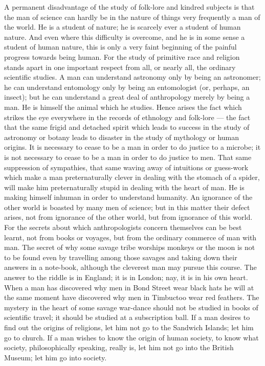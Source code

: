 
A permanent disadvantage of the study of folk-lore and kindred subjects is that the man of science can hardly be in the nature of things very frequently a man of the world. He is a student of nature; he is scarcely ever a student of human nature. And even where this difficulty is overcome, and he is in some sense a student of human nature, this is only a very faint beginning of the painful progress towards being human. For the study of primitive race and religion stands apart in one important respect from all, or nearly all, the ordinary scientific studies. A man can understand astronomy only by being an astronomer; he can understand entomology only by being an entomologist (or, perhaps, an insect); but he can understand a great deal of anthropology merely by being a man. He is himself the animal which he studies. Hence arises the fact which strikes the eye everywhere in the records of ethnology and folk-lore — the fact that the same frigid and detached spirit which leads to success in the study of astronomy or botany leads to disaster in the study of mythology or human origins. It is necessary to cease to be a man in order to do justice to a microbe; it is not necessary to cease to be a man in order to do justice to men. That same suppression of sympathies, that same waving away of intuitions or guess-work which make a man preternaturally clever in dealing with the stomach of a spider, will make him preternaturally stupid in dealing with the heart of man. He is making himself inhuman in order to understand humanity. An ignorance of the other world is boasted by many men of science; but in this matter their defect arises, not from ignorance of the other world, but from ignorance of this world. For the secrets about which anthropologists concern themselves can be best learnt, not from books or voyages, but from the ordinary commerce of man with man. The secret of why some savage tribe worships monkeys or the moon is not to be found even by travelling among those savages and taking down their answers in a note-book, although the cleverest man may pursue this course. The answer to the riddle is in England; it is in London; nay, it is in his own heart. When a man has discovered why men in Bond Street wear black hats he will at the same moment have discovered why men in Timbuctoo wear red feathers. The mystery in the heart of some savage war-dance should not be studied in books of scientific travel; it should be studied at a subscription ball. If a man desires to find out the origins of religions, let him not go to the Sandwich Islands; let him go to church. If a man wishes to know the origin of human society, to know what society, philosophically speaking, really is, let him not go into the British Museum; let him go into society.

